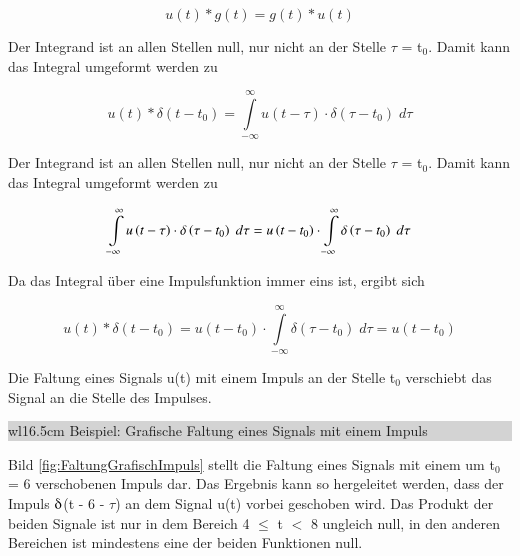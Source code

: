 \begin{equation}\label{eq:threehundredsixtynine}
u\left(t\right)*g\left(t\right)=g\left(t\right)*u\left(t\right)
\end{equation}

\noindent Der Integrand ist an allen Stellen null, nur nicht an der Stelle $\tau$ = t$_{0}$. Damit kann das Integral umgeformt werden zu

\begin{equation}\label{eq:threehundredseventy}
u\left(t\right)*\delta \left(t-t_{0} \right)=\int\limits _{-\infty }^{\infty }u\left(t-\tau \right)\cdot \delta \left(\tau -t_{0} \right)\;d\tau
\end{equation}

\noindent Der Integrand ist an allen Stellen null, nur nicht an der Stelle $\tau$ = t${}_{0}$. Damit kann das Integral umgeformt werden zu

\begin{equation}\label{eq:threehundredseventyone}
\int\limits _{-\infty }^{\infty }u\left(t-\tau \right)\cdot \delta \left(\tau -t_{0} \right){\rm \; }d\tau  =u\left(t-t_{0} \right)\cdot \int\limits _{-\infty }^{\infty }\delta \left(\tau -t_{0} \right){\rm \; }d\tau 
\end{equation}

\noindent Da das Integral \"{u}ber eine Impulsfunktion immer eins ist, ergibt sich

\begin{equation}\label{eq:threehundredseventytwo}
u\left(t\right)*\delta \left(t-t_{0} \right)=u\left(t-t_{0} \right)\cdot \int\limits _{-\infty }^{\infty }\delta \left(\tau -t_{0} \right)\;d\tau  =u\left(t-t_{0} \right)
\end{equation}

\noindent Die Faltung eines Signals u(t) mit einem Impuls an der Stelle t${}_{0}$ verschiebt das Signal an die Stelle des Impulses. \bigskip

\noindent
\colorbox{lightgray}{%
%
\renewcommand\arraystretch{0.6}%
\begin{tabular}{ wl{16.5cm} }
{\selectfont
\noindent
Beispiel: Grafische Faltung eines Signals mit einem Impuls}
\end{tabular}%
}\bigskip

\noindent Bild \ref{fig:FaltungGrafischImpuls} stellt die Faltung eines Signals mit einem um t${}_{0}$ = 6 verschobenen Impuls dar. Das Ergebnis kann so hergeleitet werden, dass der Impuls $\deltaup$(t - 6 - $\tau$) an dem Signal u(t) vorbei geschoben wird. Das Produkt der beiden Signale ist nur in dem Bereich 4 $\leq$ t $\mathrm{<}$ 8 ungleich null, in den anderen Bereichen ist mindestens eine der beiden Funktionen null.


